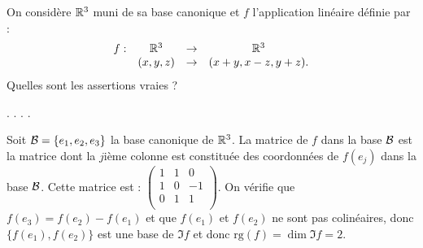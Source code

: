 \begin{question}
On considère $\mathbb{R}^3$ muni de sa base canonique et $f$ l'application linéaire définie par :
$$\begin{array}{rccc}f:&\mathbb{R}^3 &\to& \mathbb{R}^3\\
& (x,y,z)&\to &(x+y,x-z,y+z).  \end{array}$$
Quelles sont les assertions vraies ?
\begin{answers}  
.
.
.
.
\end{answers}
\begin{explanations} Soit ${\cal {B}}=\{e_1,e_2,e_3\}$ la base canonique de $\mathbb{R}^3$. La matrice de $f$ dans la base  ${\cal {B}}$ est la matrice  dont la $j$ième colonne est constituée des coordonnées de  $f(e_j)$ dans la base ${\cal {B}}$. Cette matrice est : $
\left(\begin{array}{rcc}
1&1&0\\
1&0&-1\\ 
0&1&1\\ \end{array}\right)$.
\vskip0mm
On vérifie que $f(e_3)=f(e_2)-f(e_1)$ et que $ f(e_1)$ et $ f(e_2)$ ne sont pas colinéaires, donc  $ \{f(e_1), f(e_2)\}$ 
est une base de $\Im f$ et donc $\mbox{rg} (f)= \dim \Im f = 2$.
\end{explanations}
\end{question}

